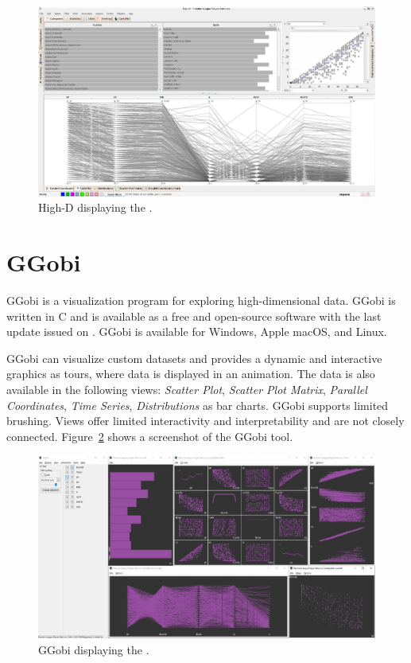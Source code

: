 \begin{figure}[tp]
\centering
\includegraphics[keepaspectratio,width=\linewidth,height=\halfh]
{images/screenshot-highd.png}

\caption[High-D]
{%
High-D displaying the \cite{premierDataset}.
}
\label{fig:ScreenshotHighD}
\end{figure}




\section{GGobi}

GGobi \parencite{cook2007interactive} is a visualization program for
exploring high-dimensional data. GGobi is written in C and is available as
a free and open-source software with the last update issued on
. GGobi is available for Windows, Apple macOS,
and Linux.

GGobi can visualize custom datasets and provides a dynamic and interactive
graphics as tours, where data is displayed in an animation. The data is
also available in the following views: \emph{Scatter Plot}, \emph{Scatter
Plot Matrix}, \emph{Parallel Coordinates}, \emph{Time Series},
\emph{Distributions} as bar charts. GGobi supports limited brushing. Views
offer limited interactivity and interpretability and are not closely
connected. Figure~\ref{fig:ScreenshotGGobi} shows a screenshot of the
GGobi tool.




\begin{figure}[tp]
\centering
\includegraphics[frame,keepaspectratio,width=\linewidth,height=\halfh]
{images/screenshot-ggobi.png}

\caption[GGobi]
{%
GGobi displaying the \cite{premierDataset}.
}
\label{fig:ScreenshotGGobi}
\end{figure}


